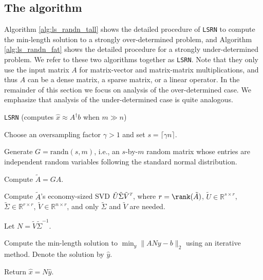 \documentclass{siamltex}
\newcommand{\T}{^{\raisebox{0.09em}{\hbox{\tiny $T$}}\hspace{-0.1em}}}
\begin{document}
\subsection{The algorithm}
\label{subsec:the_alg}

Algorithm \ref{alg:ls_randn_tall} shows the detailed procedure of \texttt{LSRN}
to compute the min-length solution to a strongly over-determined problem, and
Algorithm \ref{alg:ls_randn_fat} shows the detailed procedure for a strongly
under-determined problem.  We refer to these two algorithms together as
\texttt{LSRN}.  Note that they only use the input matrix $A$ for matrix-vector
and matrix-matrix multiplications, and thus $A$ can be a dense matrix, a sparse
matrix, or a linear operator.  In the remainder of this section we focus on
analysis of the over-determined case. We emphasize that analysis of the
under-determined case is quite analogous.

\begin{algorithm}
  \caption{\texttt{LSRN} (computes $\hat{x} \approx A^\dagger b$ when $m \gg n$)}
  \label{alg:ls_randn_tall}
  \begin{algorithmic}[1]
    \STATE Choose an oversampling factor $\gamma > 1$ and set $s = \lceil \gamma
    n \rceil$.

    \STATE Generate $G = \text{randn}(s,m)$, i.e., an $s$-by-$m$ random matrix
    whose entries are independent random variables following the standard normal
    distribution.

    \STATE Compute $\tilde{A} = G A$.

    \STATE Compute $\tilde{A}$'s economy-sized SVD $\tilde{U} \tilde{\Sigma}
    \tilde{V}\T$, where $r = \rank(\tilde{A})$, $\tilde{U} \in \mathbb{R}^{s
      \times r}$, $\tilde{\Sigma} \in \mathbb{R}^{r \times r}$, $\tilde{V} \in
    \mathbb{R}^{n \times r}$, and only $\tilde{\Sigma}$ and $\tilde{V}$ are
    needed.
    
    \STATE Let $N = \tilde{V} \tilde{\Sigma}^{-1}$.
  
    \STATE Compute the min-length solution to $\min_y \| A N y - b \|_2$ using
    an iterative method. Denote the solution by $\hat{y}$.

    \STATE Return $\hat{x} = N \hat{y}$.
  \end{algorithmic}
\end{algorithm}
\end{document}
